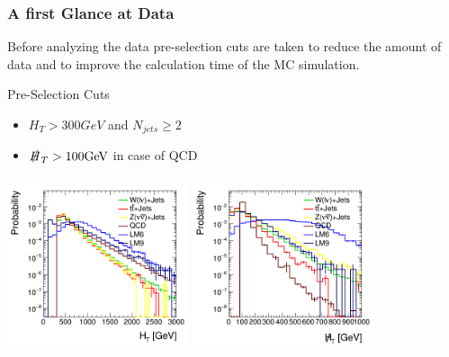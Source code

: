 

\begin{frame}
	\frametitle{A first Glance at Data}
	Before analyzing the data pre-selection cuts are taken to reduce the amount of data and to improve the calculation time of the MC simulation. 
	\begin{block}{Pre-Selection Cuts}
		\begin{itemize}
			\item  $H_T > 300\si{GeV}$ and $N_{\si{jets}} \geq 2$
			\item  $\slashed{H}_T > 100\si{GeV}$ in case of QCD
		\end{itemize}
	\end{block}
	
	\begin{center}
		\includegraphics[width = 0.4\textwidth]{plots10/hHt.png}
		\includegraphics[width = 0.4\textwidth]{plots10/hMht.png}
	\end{center}

\end{frame}

